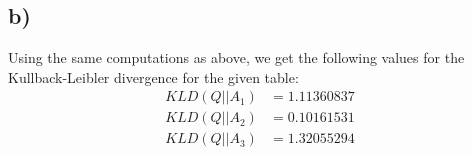 \documentclass[a4paper]{article}
\begin{document}
\subsection*{b)}
Using the same computations as above, we get the following values for the Kullback-Leibler divergence for the given table:
\begin{align*}
KLD(Q || A_1) &=  1.11360837 \\
KLD(Q || A_2) &=  0.10161531 \\
KLD(Q || A_3) &=  1.32055294 
\end{align*}
\end{document}
